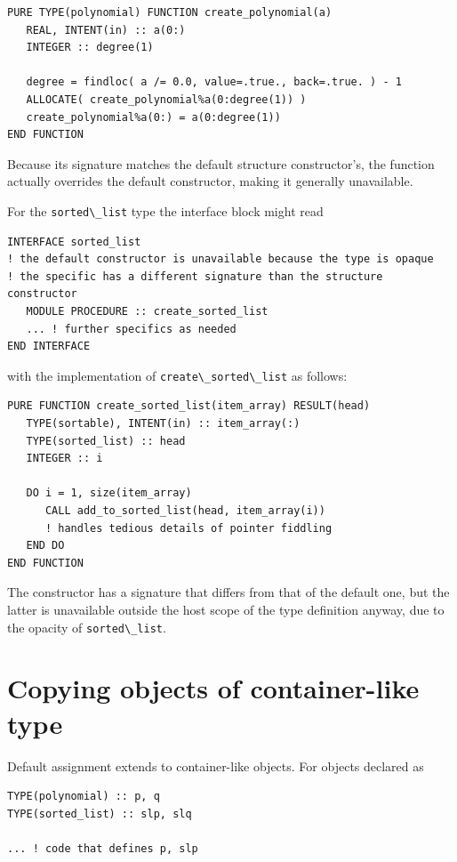 \documentclass[
  paper=a4,
  ,captions=tableheading
]{scrartcl}
\newcommand{\passthrough}[1]{#1}
\begin{document}
\begin{lstlisting}
PURE TYPE(polynomial) FUNCTION create_polynomial(a)
   REAL, INTENT(in) :: a(0:)
   INTEGER :: degree(1)

   degree = findloc( a /= 0.0, value=.true., back=.true. ) - 1
   ALLOCATE( create_polynomial%a(0:degree(1)) )
   create_polynomial%a(0:) = a(0:degree(1))
END FUNCTION
\end{lstlisting}

Because its signature matches the default structure constructor's, the
function actually overrides the default constructor, making it generally
unavailable.

For the \passthrough{\lstinline!sorted\_list!} type the interface block
might read

\begin{lstlisting}
INTERFACE sorted_list
! the default constructor is unavailable because the type is opaque
! the specific has a different signature than the structure constructor
   MODULE PROCEDURE :: create_sorted_list
   ... ! further specifics as needed
END INTERFACE
\end{lstlisting}

with the implementation of
\passthrough{\lstinline!create\_sorted\_list!} as follows:

\begin{lstlisting}
PURE FUNCTION create_sorted_list(item_array) RESULT(head)
   TYPE(sortable), INTENT(in) :: item_array(:)
   TYPE(sorted_list) :: head
   INTEGER :: i

   DO i = 1, size(item_array)
      CALL add_to_sorted_list(head, item_array(i))
      ! handles tedious details of pointer fiddling
   END DO
END FUNCTION
\end{lstlisting}

The constructor has a signature that differs from that of the default
one, but the latter is unavailable outside the host scope of the type
definition anyway, due to the opacity of
\passthrough{\lstinline!sorted\_list!}.

\section{Copying objects of container-like
type}\label{copying-objects-of-container-like-type}

Default assignment extends to container-like objects. For objects
declared as

\begin{lstlisting}
TYPE(polynomial) :: p, q
TYPE(sorted_list) :: slp, slq

... ! code that defines p, slp
\end{lstlisting}
\end{document}
